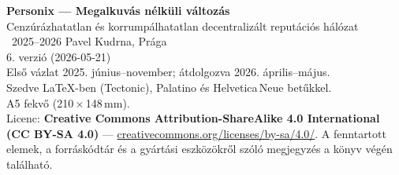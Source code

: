 \thispagestyle{empty}
\ifdefined\printmode\vspace*{\fill}\else{}\fi
\begin{flushleft}\small\sffamily
\textbf{Personix --- Megalkuvás nélküli változás}\\[0.3em]
Cenzúrázhatatlan és korrumpálhatatlan decentralizált reputációs hálózat\\[1.4em]

\textcopyright\ 2025--2026 Pavel Kudrna, Prága\\[0.4em]

6. verzió (2026-05-21)\\
Első vázlat 2025. június--november; átdolgozva 2026. április--május.\\[1.4em]

Szedve \LaTeX{}-ben (Tectonic), Palatino és Helvetica\,Neue betűkkel.\\
A5 fekvő (210\,$\times$\,148\,mm).\\[1.4em]

Licenc: \textbf{Creative Commons Attribution-ShareAlike 4.0
International (CC BY-SA 4.0)} ---
\href{https://creativecommons.org/licenses/by-sa/4.0/}{creativecommons.org/licenses/by-sa/4.0/}.
A fenntartott elemek, a forráskódtár és a gyártási eszközökről szóló
megjegyzés a könyv végén található.
\end{flushleft}
\ifdefined\printmode\else{}\fi
\clearpage
